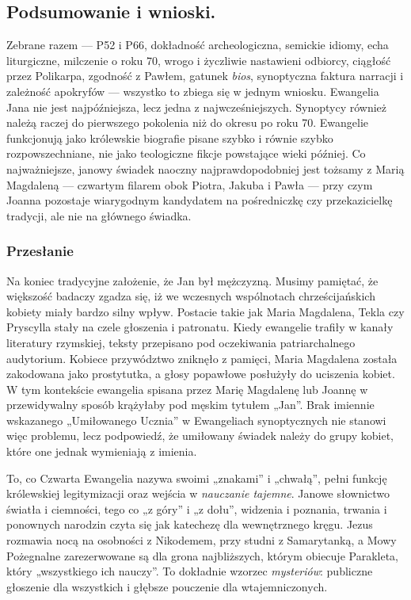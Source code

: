 \subsection{Podsumowanie i wnioski.}\label{subsec:summary-and-consequence.}

Zebrane razem --- P52 i P66, dokładność archeologiczna, semickie idiomy, echa liturgiczne, milczenie o roku 70, wrogo i życzliwie nastawieni odbiorcy, ciągłość przez Polikarpa, zgodność z Pawłem, gatunek \emph{bios}, synoptyczna faktura narracji i zależność apokryfów --- wszystko to zbiega się w jednym wniosku.
Ewangelia Jana nie jest najpóźniejsza, lecz jedna z najwcześniejszych.
Synoptycy również należą raczej do pierwszego pokolenia niż do okresu po roku 70.
Ewangelie funkcjonują jako królewskie biografie pisane szybko i równie szybko rozpowszechniane, nie jako teologiczne fikcje powstające wieki później.
Co najważniejsze, janowy świadek naoczny najprawdopodobniej jest tożsamy z Marią Magdaleną --- czwartym filarem obok Piotra, Jakuba i Pawła --- przy czym Joanna pozostaje wiarygodnym kandydatem na pośredniczkę czy przekazicielkę tradycji, ale nie na głównego świadka.

\subsubsection{Przesłanie}\label{subsubsec:the-message}

Na koniec tradycyjne założenie, że Jan był mężczyzną.
Musimy pamiętać, że większość badaczy zgadza się, iż we wczesnych wspólnotach chrześcijańskich kobiety miały bardzo silny wpływ.
Postacie takie jak Maria Magdalena, Tekla czy Pryscylla stały na czele głoszenia i patronatu.
Kiedy ewangelie trafiły w kanały literatury rzymskiej, teksty przepisano pod oczekiwania patriarchalnego audytorium.
Kobiece przywództwo zniknęło z pamięci, Maria Magdalena została zakodowana jako prostytutka, a głosy popawłowe posłużyły do uciszenia kobiet.
W tym kontekście ewangelia spisana przez Marię Magdalenę lub Joannę w przewidywalny sposób krążyłaby pod męskim tytułem „Jan”.
Brak imiennie wskazanego „Umiłowanego Ucznia” w Ewangeliach synoptycznych nie stanowi więc problemu, lecz podpowiedź, że umiłowany świadek należy do grupy kobiet, które one jednak wymieniają z imienia.

To, co Czwarta Ewangelia nazywa swoimi „znakami” i „chwałą”, pełni funkcję królewskiej legitymizacji oraz wejścia w \emph{nauczanie tajemne}.
Janowe słownictwo światła i ciemności, tego co „z góry” i „z dołu”, widzenia i poznania, trwania i ponownych narodzin czyta się jak katechezę dla wewnętrznego kręgu.
Jezus rozmawia nocą na osobności z Nikodemem, przy studni z Samarytanką, a Mowy Pożegnalne zarezerwowane są dla grona najbliższych, którym obiecuje Parakleta, który „wszystkiego ich nauczy”.
To dokładnie wzorzec \emph{mysteriów}: publiczne głoszenie dla wszystkich i głębsze pouczenie dla wtajemniczonych.

